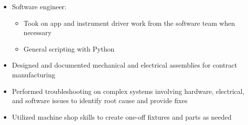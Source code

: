{\begin{itemize}
\begin{itemize}
            \item Cross-functionally gathered requirements, led design reviews, and managed equipment and system validation across the CLIA lab staff, equipment service team, and development scientists
            \item Assessed what work was required, generated and maintained a timeline, and tracked and distributed work amongst myself and others
            \item Successfully completed the project ahead of schedule and without issues
        \end{itemize}%
        \item Software engineer:
        \begin{itemize}%
            \item Took on app and instrument driver work from the software team when necessary
            \item General scripting with Python
        \end{itemize}%
        \item Designed and documented mechanical and electrical assemblies for contract manufacturing
        \item Performed troubleshooting on complex systems involving hardware, electrical, and software issues to identify root cause and provide fixes
        \item Utilized machine shop skills to create one-off fixtures and parts as needed
    \end{itemize}
}
\divLine
{}
\divLine
{}

